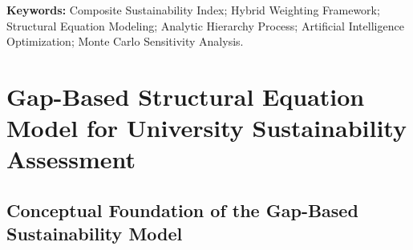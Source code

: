 \documentclass[11pt,a4paper]{article}
\begin{document}
\noindent\textbf{Keywords:} Composite Sustainability Index; Hybrid Weighting Framework; Structural Equation Modeling; Analytic Hierarchy Process; Artificial Intelligence Optimization; Monte Carlo Sensitivity Analysis.

\section{Gap-Based Structural Equation Model for University Sustainability Assessment}







\subsection{Conceptual Foundation of the Gap-Based Sustainability Model}
\end{document}
